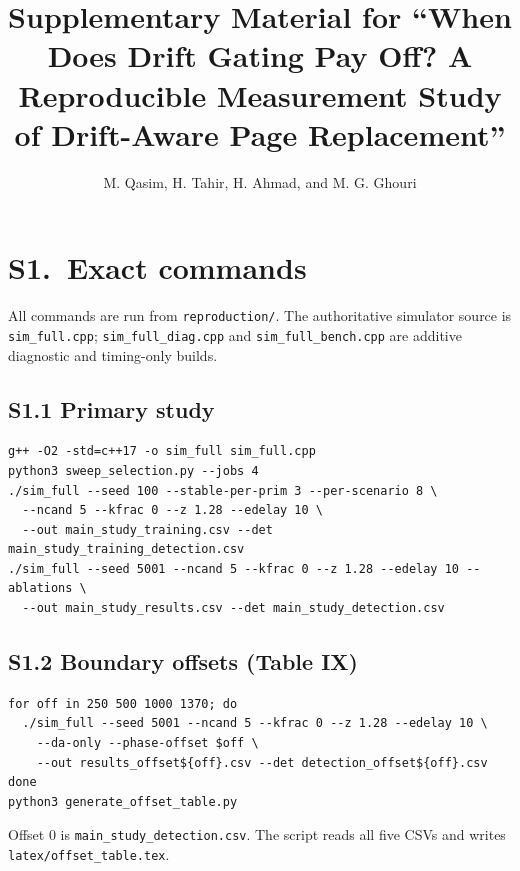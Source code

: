 \documentclass[journal,onecolumn]{IEEEtran}
\begin{document}
\title{Supplementary Material for ``When Does Drift Gating Pay Off? A
Reproducible Measurement Study of Drift-Aware Page Replacement''}
\author{M. Qasim, H. Tahir, H. Ahmad, and M. G. Ghouri}
\maketitle

\section{S1.\ Exact commands}

All commands are run from \texttt{reproduction/}. The authoritative simulator
source is \texttt{sim\_full.cpp}; \texttt{sim\_full\_diag.cpp} and
\texttt{sim\_full\_bench.cpp} are additive diagnostic and timing-only builds.

\subsection{S1.1 Primary study}
\begin{verbatim}
g++ -O2 -std=c++17 -o sim_full sim_full.cpp
python3 sweep_selection.py --jobs 4
./sim_full --seed 100 --stable-per-prim 3 --per-scenario 8 \
  --ncand 5 --kfrac 0 --z 1.28 --edelay 10 \
  --out main_study_training.csv --det main_study_training_detection.csv
./sim_full --seed 5001 --ncand 5 --kfrac 0 --z 1.28 --edelay 10 --ablations \
  --out main_study_results.csv --det main_study_detection.csv
\end{verbatim}

\subsection{S1.2 Boundary offsets (Table IX)}
\begin{verbatim}
for off in 250 500 1000 1370; do
  ./sim_full --seed 5001 --ncand 5 --kfrac 0 --z 1.28 --edelay 10 \
    --da-only --phase-offset $off \
    --out results_offset${off}.csv --det detection_offset${off}.csv
done
python3 generate_offset_table.py
\end{verbatim}
Offset 0 is \texttt{main\_study\_detection.csv}. The script reads all five
CSVs and writes \texttt{latex/offset\_table.tex}.
\end{document}
